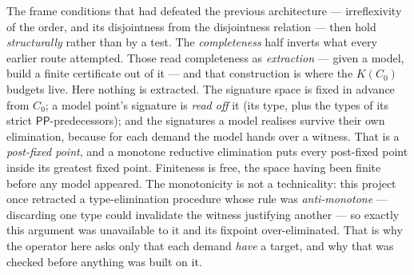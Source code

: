 \documentclass[11pt]{article}
\newcommand{\PP}{\ensuremath{\mathsf{PP}}}
\begin{document}
\begin{enumerate}
  The frame conditions that had defeated the previous architecture ---
  irreflexivity of the order, and its disjointness from the disjointness
  relation --- then hold \emph{structurally} rather than by a test.
  The \emph{completeness} half inverts what every earlier route attempted.
  Those read completeness as \emph{extraction} --- given a model, build a finite
  certificate out of it --- and that construction is where the $K(C_0)$ budgets
  live. Here nothing is extracted. The signature space is fixed in advance from
  $C_0$; a model point's signature is \emph{read off} it (its type, plus the
  types of its strict $\PP$-predecessors); and the signatures a model realises
  survive their own elimination, because for each demand the model hands over a
  witness. That is a \emph{post-fixed point}, and a monotone reductive
  elimination puts every post-fixed point inside its greatest fixed point.
  Finiteness is free, the space having been finite before any model appeared.
  The monotonicity is not a technicality: this project once retracted a
  type-elimination procedure whose rule was \emph{anti-monotone} --- discarding
  one type could invalidate the witness justifying another --- so exactly this
  argument was unavailable to it and its fixpoint over-eliminated. That is why
  the operator here asks only that each demand \emph{have} a target, and why
  that was checked before anything was built on it.


\end{enumerate}
\end{document}
